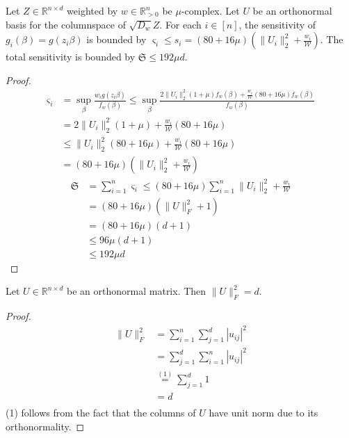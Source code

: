 \begin{lemma}
    Let $Z \in \mathbb{R}^{n \times d}$ weighted by $w \in \mathbb{R}^n_{>0}$
    be $\mu$-complex. Let $U$ be an orthonormal basis for the columnspace
    of $\sqrt{D_w} Z$.
    For each $i \in [n]$, the sensitivity of $g_i(\beta) = g(z_i \beta)$
    is bounded by
    $\varsigma_i \leq s_i = (80 + 16\mu)(\lVert U_i \rVert_2^2 + \frac{w_i}{\mathcal{W}})$.
    The total sensitivity is bounded by $\mathfrak{S} \leq 192 \mu d$.
\end{lemma}
\begin{proof}
    \begin{align*}
        \varsigma_i
         & = \sup_{\beta} \frac{w_i g(z_i \beta)}{f_w(\beta)}
        \leq \sup_{\beta} \frac{2 \lVert U_i \rVert_2^2 (1 + \mu) f_w(\beta)
            + \frac{w_i}{\mathcal{W}} (80 + 16 \mu) f_w(\beta)}{f_w(\beta)}                  \\
         & = 2 \lVert U_i \rVert_2^2 (1 + \mu) + \frac{w_i}{\mathcal{W}} (80 + 16 \mu)       \\
         & \leq \lVert U_i \rVert_2^2 (80 + 16 \mu) +  \frac{w_i}{\mathcal{W}} (80 + 16 \mu) \\
         & = (80 + 16\mu)(\lVert U_i \rVert_2^2 + \frac{w_i}{\mathcal{W}})
    \end{align*}
    \begin{align*}
        \mathfrak{S}
         & = \sum_{i=1}^n \varsigma_i \leq (80 + 16\mu) \sum_{i=1}^n \lVert U_i \rVert_2^2 + \frac{w_i}{\mathcal{W}} \\
         & = (80 + 16 \mu)(\lVert U \rVert_F^2 + 1)                                                                  \\
         & = (80 + 16 \mu)(d + 1)                                                                                    \\
         & \leq 96 \mu(d + 1)                                                                                        \\
         & \leq 192 \mu d
    \end{align*}
\end{proof}

\begin{lemma}
    Let $U \in \mathbb{R}^{n \times d}$ be an orthonormal matrix.
    Then $\lVert U \rVert_F^2 = d$.
\end{lemma}
\begin{proof}
    \begin{align*}
        \lVert U \rVert_F^2
         & = \sum_{i=1}^n \sum_{j=1}^d |u_{ij}|^2 \\
         & = \sum_{j=1}^d \sum_{i=1}^n |u_{ij}|^2 \\
         & \overset{(1)}{=} \sum_{j=1}^d 1        \\
         & = d                                    \\
    \end{align*}
    (1) follows from the fact that the columns of $U$ have unit norm
    due to its orthonormality.
\end{proof}